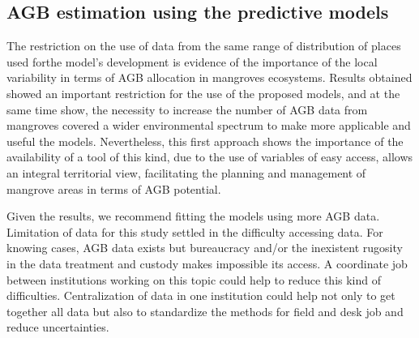 \documentclass[review, authoryear]{elsarticle}   	%
\begin{document}
 
 \subsection {AGB estimation using the predictive models}
 
The restriction on the use of data from the same range of distribution of places used forthe model's development is evidence of the importance of the local variability in terms of AGB allocation in mangroves ecosystems. Results obtained showed an important restriction for the use
of the proposed models, and at the same time show, the necessity to increase the number of AGB data from mangroves covered a wider environmental spectrum to make more applicable and useful the models. Nevertheless, this first approach shows the importance of the availability of a tool of this kind, due to the use of variables of easy access, allows an integral territorial view, facilitating the planning and management of mangrove areas in terms of AGB potential.

Given the results, we recommend fitting the models using more AGB data. Limitation of data for this study settled in the difficulty accessing data. For knowing cases, AGB data exists but bureaucracy and/or the inexistent rugosity in the data treatment and custody makes impossible its access. A coordinate job between institutions working on this topic could help to reduce this kind of difficulties. Centralization of data in one institution could help not only to get together all data but also to standardize the methods for field and desk job and reduce uncertainties.
\end{document}
